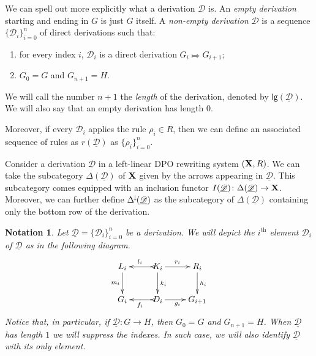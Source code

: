 \documentclass[a4paper,UKenglish,cleveref,pdftex, thm-restate,numberwithinsect]{lipics}
\newcommand{\Deltamin}{\Delta^{\hspace{-1pt}\downarrow\hspace{-1pt}}}
\def\R{\mathsf{R}}
\def\X{\textbf {\textup{X}}}
\newcommand{\dder}[1]{\mathscr{#1}}
\newcommand{\der}[1]{\underline{\dder{#1}}}
\def\gpo{\mathsf{G}^{\X}_R}
\newcommand{\lgh}[0]{\mathsf{lg}}
\newtheorem*{notation}{Notation}
\newcommand{\rem}[2]{{\color{blue}#1}{\color{red}#2}}
\renewcommand{\rem}[2]{}
\begin{document}
\rem{Mi pare si possa omettere}{
  If we look to direct derivations as transitions, it is natural to consider them as edges in a direct graph. Taking objects as vertices objects led us to the following definition \cite{heindel2009category}.

\begin{definition}
	Let $(\X, \R)$ be a left-linear DPO rewrityng system, with $\X$ $\mathcal{M}$-adhesive. The \emph{DPO-derivation graph} of $(\X, \R)$ is the (large)  directed graph $\gpo$ having as vertices the objects of $\X$ and in which an edge between $G$ and $H$ is a direct derivation $\dder{D}\colon G\Mapsto H$.	A \emph{derivation} $\der{D}$ between two objects $G$ and $H$ is a path between them in $\gpo$. The \emph{source} and \emph{target} of $\der{D}$ are, respectively, $G$ and $H$.
\end{definition}
}
\begin{remark}
We can spell out more explicitly what  a derivation $\dder{D}$ is.  An \emph{empty derivation} starting and ending in $G$ is just $G$ itself.  A \emph{non-empty derivation} $\dder{D}$ is a sequence $\{\dder{D}_i\}_{i=0}^n$ of direct derivations such that:
\begin{enumerate}
	\item for every index $i$, $\dder{D}_i$ is a direct derivation $G_i \Mapsto G_{i+1}$;
	\item $G_0=G$ and $G_{n+1}=H$.
\end{enumerate}

We will call the number $n+1$ the \emph{length} of the derivation, denoted by $\lgh(\der{D})$. We will also say that an empty derivation has length $0$. 

Moreover,  if every $\dder{D}_i$ applies the rule $\rho_i\in R$, then we can define an associated sequence of rules as $r(\der{D})$ as $\{\rho_i\}_{i=0}^n$.
\end{remark}

\begin{remark}
  \label{rem:func}
  Consider a derivation $\der{D}$ in a left-linear DPO rewriting
  system $(\X, \R)$. We can take the subcategory $\Delta(\der{D})$ of
  $\X$ given by the arrows appearing in $\der{D}$. This subcategory
  comes equipped with an inclusion functor
  $I(\der{D})\colon \Delta(\der{D})\to \X$. Moreover, we can further
  define $\Deltamin(\der{D})$ as the subcategory of $\Delta(\der{D})$
  containing only the bottom row of the derivation.
\end{remark}
	
\begin{notation}
  Let $\der{D}=\{\dder{D}_i\}_{i=0}^n$ be a derivation. We will depict
  the $i^\text{th}$ element $\dder{D}_i$ of $\der{D}$ as in the
  following diagram.
  \[\xymatrix{L_i \ar[d]_{m_i}& K_i \ar[d]^{k_i}\ar@{>->}[l]_{l_i} \ar[r]^{r_i} & R_i \ar[d]^{h_i} \\G_{i} & \ar@{>->}[l]^{f_{i}} D_{i} \ar[r]_{g_{i}}& G_{i+1} }\]
  Notice that, in particular, if $\der{D}\colon G\to H$, then $G_0=G$
  and $G_{n+1}=H$. When $\der{D}$ has length $1$ we will suppress the
  indexes. In such case, we will also identify $\der{D}$ with its only
  element.
\end{notation} 
\end{document}
